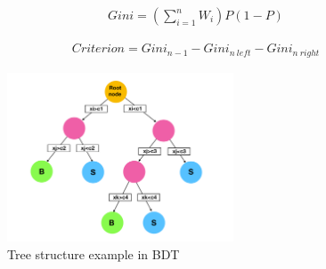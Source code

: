 \begin{align}\label{Equ.BDTGini} 
Gini=(\sum_{i=1}^{n}W_{i})P(1-P)
\end{align}

\begin{align}\label{Equ.BDTtreecriterion} 
Criterion=Gini_{n-1}-Gini_{n \ left}-Gini_{n \ right}
\end{align}


\begin{figure}[!tbp] 
\centering
\includegraphics[width=0.6\textwidth]{chapter7/BDT_tree_show.pdf}
\caption{Tree structure example in BDT}
\label{fig:BDTtreestructure}
\end{figure}

